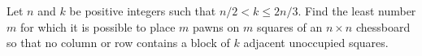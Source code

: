 Let $n$ and $k$ be positive integers such that $n/2 < k \leq 2n/3$. Find the least number $m$ for which it is possible to place $m$ pawns on $m$ squares of an $n \times n$ chessboard so that no column or row contains a block of $k$ adjacent unoccupied squares.
